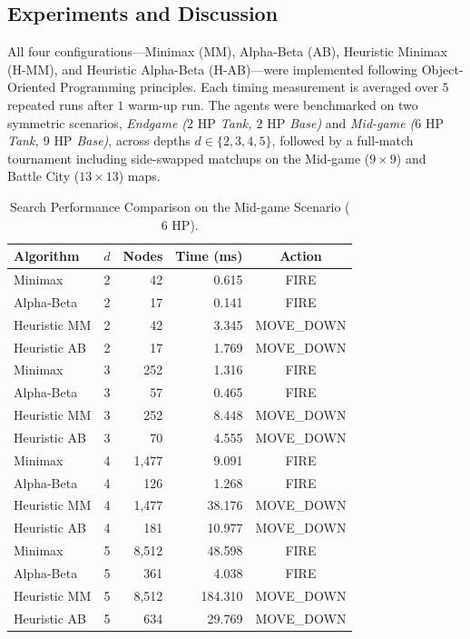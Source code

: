 \subsection{Experiments and Discussion}
All four configurations---Minimax (MM), Alpha-Beta (AB), Heuristic Minimax (H-MM), and Heuristic Alpha-Beta (H-AB)---were implemented following Object-Oriented Programming principles. Each timing measurement is averaged over $5$ repeated runs after $1$ warm-up run. The agents were benchmarked on two symmetric scenarios, \textit{Endgame ($2\text{ HP}$ Tank, $2\text{ HP}$ Base)} and \textit{Mid-game ($6\text{ HP}$ Tank, $9\text{ HP}$ Base)}, across depths $d \in \{2, 3, 4, 5\}$, followed by a full-match tournament including side-swapped matchups on the Mid-game ($9\times 9$) and Battle City ($13\times 13$) maps.

\begin{table}[htbp]
\caption{Search Performance Comparison on the Mid-game Scenario ($6\text{ HP}$).}
\begin{center}
\begin{tabular}{|l|c|r|r|c|}
\hline
\textbf{Algorithm} & \textbf{$d$} & \textbf{Nodes} & \textbf{Time (ms)} & \textbf{Action} \\
\hline
Minimax & 2 & 42 & 0.615 & FIRE \\
Alpha-Beta & 2 & 17 & 0.141 & FIRE \\
Heuristic MM & 2 & 42 & 3.345 & MOVE\_DOWN \\
Heuristic AB & 2 & 17 & 1.769 & MOVE\_DOWN \\
\hline
Minimax & 3 & 252 & 1.316 & FIRE \\
Alpha-Beta & 3 & 57 & 0.465 & FIRE \\
Heuristic MM & 3 & 252 & 8.448 & MOVE\_DOWN \\
Heuristic AB & 3 & 70 & 4.555 & MOVE\_DOWN \\
\hline
Minimax & 4 & 1{,}477 & 9.091 & FIRE \\
Alpha-Beta & 4 & 126 & 1.268 & FIRE \\
Heuristic MM & 4 & 1{,}477 & 38.176 & MOVE\_DOWN \\
Heuristic AB & 4 & 181 & 10.977 & MOVE\_DOWN \\
\hline
Minimax & 5 & 8{,}512 & 48.598 & FIRE \\
Alpha-Beta & 5 & 361 & 4.038 & FIRE \\
Heuristic MM & 5 & 8{,}512 & 184.310 & MOVE\_DOWN \\
Heuristic AB & 5 & 634 & 29.769 & MOVE\_DOWN \\
\hline
\end{tabular}
\label{tab:task2_perf}
\end{center}
\end{table}

